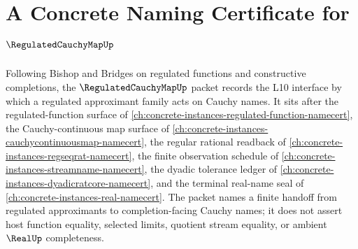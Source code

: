 \chapter{A Concrete Naming Certificate for $\RegulatedCauchyMapUp$}
\label{ch:concrete-instances-regulated-cauchy-map-namecert}

Following Bishop and Bridges on regulated functions and constructive completions, the $\RegulatedCauchyMapUp$ packet records the L10 interface by which a regulated approximant family acts on Cauchy names. It sits after the regulated-function surface of \autoref{ch:concrete-instances-regulated-function-namecert}, the Cauchy-continuous map surface of \autoref{ch:concrete-instances-cauchycontinuousmap-namecert}, the regular rational readback of \autoref{ch:concrete-instances-regseqrat-namecert}, the finite observation schedule of \autoref{ch:concrete-instances-streamname-namecert}, the dyadic tolerance ledger of \autoref{ch:concrete-instances-dyadicratcore-namecert}, and the terminal real-name seal of \autoref{ch:concrete-instances-real-namecert}. The packet names a finite handoff from regulated approximants to completion-facing Cauchy names; it does not assert host function equality, selected limits, quotient stream equality, or ambient $\RealUp$ completeness.

